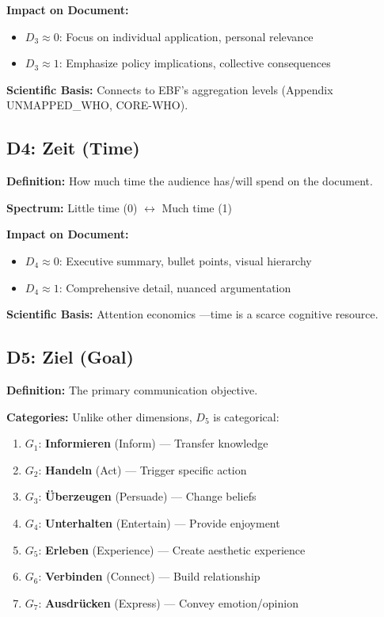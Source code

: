 \textbf{Impact on Document:}
\begin{itemize}[nosep]
\item $D_3 \approx 0$: Focus on individual application, personal relevance
\item $D_3 \approx 1$: Emphasize policy implications, collective consequences
\end{itemize}

\textbf{Scientific Basis:} Connects to EBF's aggregation levels
(Appendix UNMAPPED_WHO, CORE-WHO).

\subsection{D4: Zeit (Time)}

\textbf{Definition:} How much time the audience has/will spend on the document.

\textbf{Spectrum:} Little time (0) $\leftrightarrow$ Much time (1)

\textbf{Impact on Document:}
\begin{itemize}[nosep]
\item $D_4 \approx 0$: Executive summary, bullet points, visual hierarchy
\item $D_4 \approx 1$: Comprehensive detail, nuanced argumentation
\end{itemize}

\textbf{Scientific Basis:} Attention economics \citep{davenport2001}---time is
a scarce cognitive resource.

\subsection{D5: Ziel (Goal)}

\textbf{Definition:} The primary communication objective.

\textbf{Categories:} Unlike other dimensions, $D_5$ is categorical:

\begin{enumerate}[nosep]
\item $G_1$: \textbf{Informieren} (Inform) --- Transfer knowledge
\item $G_2$: \textbf{Handeln} (Act) --- Trigger specific action
\item $G_3$: \textbf{\"Uberzeugen} (Persuade) --- Change beliefs
\item $G_4$: \textbf{Unterhalten} (Entertain) --- Provide enjoyment
\item $G_5$: \textbf{Erleben} (Experience) --- Create aesthetic experience
\item $G_6$: \textbf{Verbinden} (Connect) --- Build relationship
\item $G_7$: \textbf{Ausdr\"ucken} (Express) --- Convey emotion/opinion
\end{enumerate}

